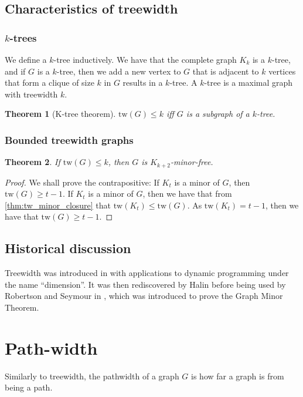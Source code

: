 \documentclass[]{report}
\newcommand{\tw}{\text{tw}}
\newtheorem{theorem}{Theorem}
\theoremstyle{definition}
\numberwithin{theorem}{section}
\numberwithin{equation}{section}
\begin{document}
\subsection{Characteristics of treewidth}\label{ssec:characterising_Treewidth}
\subsubsection{$k$-trees}\label{sssec:k-trees}
We define a $k$-tree inductively. We have that the complete graph $K_k$ is a $k$-tree, and if $G$ is a $k$-tree, then we add a new vertex to $G$ that is adjacent to $k$ vertices that form a clique of size $k$ in $G$ results in a $k$-tree. 
A $k$-tree is a maximal graph with treewidth $k$. 
\begin{theorem}[K-tree theorem]
	$\tw(G) \leq k$ iff $G$ is a subgraph of a $k$-tree. 
\end{theorem}


\subsubsection{Bounded treewidth graphs}\label{sssec:Graph_treewidth_Bounded}
\begin{theorem}\label{thm:treewidth_clique-minor-free}
	If $\tw(G) \leq k$, then $G$ is $K_{k+2}$-minor-free. 
\end{theorem}
\begin{proof}
	We shall prove the contrapositive: If $K_t$ is a minor of $G$, then $\tw(G) \geq t-1$.
	If $K_t$ is a minor of $G$, then we have that from \cref{thm:tw_minor_closure} that $\tw(K_t) \leq \tw(G)$. As $\tw(K_t) = t-1$, then we have that $\tw(G) \geq t - 1$. 
\end{proof}

\subsection{Historical discussion}\label{ssec:tw_historical}
Treewidth was introduced in \cite{berteleChapterEliminationVariables1972} with applications to dynamic programming under the name ``dimension''. It was then rediscovered by Halin \cite{halinSfunctionsGraphs1976} before being used by Robertson and Seymour in \cite{robertsonGraphMinorsIII1984}, which was introduced to prove the Graph Minor Theorem\cite{robertsonGraphMinorsXX2004}.


\section{Path-width}\label{sec:Pathwidth}
Similarly to treewidth, the pathwidth of a graph $G$ is how far a graph is from being a path. 
\end{document}
